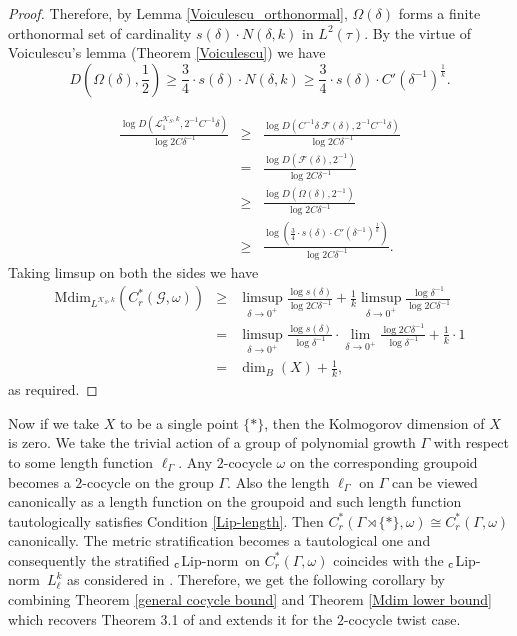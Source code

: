 \documentclass[a4paper,11pt,reqno]{amsart}
\theoremstyle{plain}
\theoremstyle{mainthmstyle}
\theoremstyle{named}
\numberwithin{equation}{section}
\newcommand{\Bea}{\begin{eqnarray*}}
\newcommand{\Eea}{\end{eqnarray*}}
\newcommand{\clipnorm}{$_{\text{\rm c}}$Lip-norm}
\begin{document}
\begin{proof}
Therefore, by Lemma \ref{Voiculescu_orthonormal}, $\Omega(\delta)$ forms a finite orthonormal set of cardinality $s (\delta) \cdot N(\delta, k)$ in $L^2(\tau).$
By the virtue of Voiculescu's lemma (Theorem \ref{Voiculescu}) we have
$$D \left (\Omega (\delta), \frac {1} {2} \right ) \geq \frac {3} {4} \cdot s (\delta) \cdot N(\delta, k) \geq \frac {3} {4} \cdot s (\delta) \cdot C' \left (\delta^{-1} \right )^{\frac {1} {k}}.$$

\Bea
\frac {\log D \left (\mathcal L^{\mathcal K_S, k}_1, 2^{-1} C^{-1} \delta \right )} {\log 2 C \delta^{-1}} & \geq & \frac {\log D \left (C^{-1} \delta\ \mathcal F (\delta), 2^{-1} C^{-1} \delta \right )} {\log 2 C \delta^{-1}} \\ & = & \frac {\log D \left (\mathcal F (\delta), 2^{-1} \right )} {\log 2 C \delta^{-1}} \\ & \geq & \frac {\log D \left (\Omega (\delta), 2^{-1} \right )} {\log 2 C \delta^{-1}} \\ & \geq & \frac {\log \left (\frac {3} {4} \cdot s (\delta) \cdot C' \left (\delta^{-1} \right )^{\frac {1} {k}} \right )} {\log 2 C \delta^{-1}}.
\Eea
Taking limsup on both the sides we have
\Bea 
\mathrm {Mdim}_{L^{\mathcal K_S, k}} \left (C_r^{\ast} (\mathcal G, \omega) \right ) & \geq & \limsup\limits_{\delta \to 0^{+}} \frac {\log s (\delta)} {\log 2 C \delta^{-1}} + \frac {1} {k} \limsup\limits_{\delta \to 0^{+}} \frac {\log \delta^{-1}} {\log 2 C \delta^{-1}} \\ & = & \limsup\limits_{\delta \to 0^{+}} \frac {\log s (\delta)} {\log \delta^{-1}} \cdot \lim\limits_{\delta \to 0^{+}} \frac {\log 2 C \delta^{-1}} {\log \delta^{-1}} + \frac {1} {k} \cdot 1 \\ & = & \dim_{B} (X) + \frac {1} {k},
\Eea
as required.

\end{proof}
Now if we take $X$ to be a single point $\{\ast\}$, then the Kolmogorov dimension of $X$ is zero. We take the trivial action of a group of polynomial growth $\Gamma$ with respect to some length function $\ell_{\Gamma}$. Any $2$-cocycle $\omega$ on the corresponding groupoid becomes a $2$-cocycle on the group $\Gamma$. Also the length $\ell_{\Gamma}$ on $\Gamma$ can be viewed canonically as a length function on the groupoid and such length function tautologically satisfies Condition \ref{Lip-length}. Then $C^{\ast}_{r}(\Gamma\rtimes\{{\ast}\},\omega)\cong C_{r}^{\ast}(\Gamma,\omega)$ canonically. The metric stratification becomes a tautological one and consequently the stratified \clipnorm\ on $C^{\ast}_{r}(\Gamma,\omega)$ coincides with the \clipnorm\ $L^{k}_{\ell}$ as considered in \cite{chattopadhyay2026metric}. Therefore, we get the following corollary by combining Theorem \ref{general cocycle bound} and Theorem \ref{Mdim lower bound} which recovers Theorem 3.1 of \cite{chattopadhyay2026metric} and extends it for the $2$-cocycle twist case.
\end{document}
